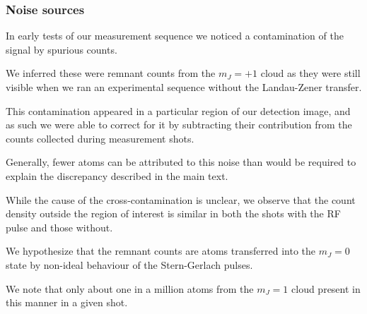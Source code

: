 \subsubsection{Noise sources}
\label{sec:spinpop}

	In early tests of our measurement sequence we noticed a contamination of the signal by spurious counts.
	
	We inferred these were remnant counts from the $m_J=+1$ cloud as they were still visible when we ran an experimental sequence without the Landau-Zener transfer.
	
	This contamination appeared in a particular region of our detection image, and as such we were able to correct for it by subtracting their contribution from the counts collected during measurement shots.
	
	Generally, fewer atoms can be attributed to this noise than would be required to explain the discrepancy described in the main text.
	
	While the cause of the cross-contamination is unclear, we observe that the count density outside the region of interest is similar in both the shots with the RF pulse and those without.
	
	We hypothesize that the remnant counts are atoms transferred into the $m_J=0$ state by non-ideal behaviour of the Stern-Gerlach pulses.
	
	We note that only about one in a million atoms from the $m_J=1$ cloud present in this manner in a given shot.



